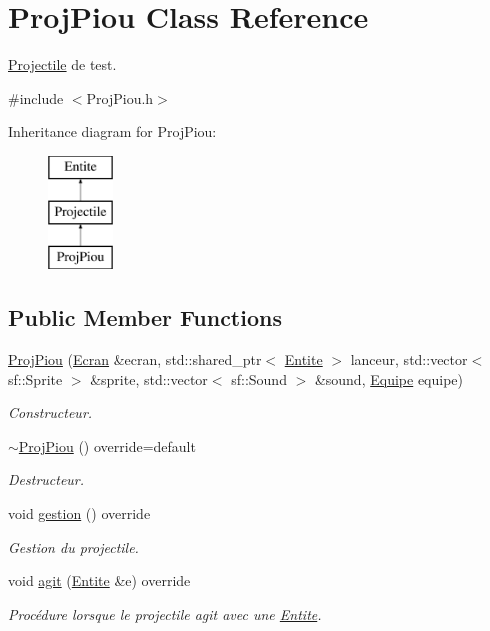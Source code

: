 \hypertarget{class_proj_piou}{}\section{Proj\+Piou Class Reference}
\label{class_proj_piou}


\mbox{\hyperlink{class_projectile}{Projectile}} de test.  




{\ttfamily \#include $<$Proj\+Piou.\+h$>$}

Inheritance diagram for Proj\+Piou\+:\begin{figure}[H]
\begin{center}
\leavevmode
\includegraphics[height=3.000000cm]{class_proj_piou}
\end{center}
\end{figure}
\subsection*{Public Member Functions}
\begin{DoxyCompactItemize}
\item 
\mbox{\hyperlink{class_proj_piou_ad1c36a2d7605a09cd964877850394eac}{Proj\+Piou}} (\mbox{\hyperlink{class_ecran}{Ecran}} \&ecran, std\+::shared\+\_\+ptr$<$ \mbox{\hyperlink{class_entite}{Entite}} $>$ lanceur, std\+::vector$<$ sf\+::\+Sprite $>$ \&sprite, std\+::vector$<$ sf\+::\+Sound $>$ \&sound, \mbox{\hyperlink{constantes_8h_a08fa5554288d5031a8f3bb83cc04ee83}{Equipe}} equipe)
\begin{DoxyCompactList}\small\item\em Constructeur. \end{DoxyCompactList}\item 
\mbox{\hyperlink{class_proj_piou_a47030760366b4c36b2f2d6cbd3db3aa8}{$\sim$\+Proj\+Piou}} () override=default
\begin{DoxyCompactList}\small\item\em Destructeur. \end{DoxyCompactList}\item 
void \mbox{\hyperlink{class_proj_piou_aa25660500d188f1085f8289db91a6170}{gestion}} () override
\begin{DoxyCompactList}\small\item\em Gestion du projectile. \end{DoxyCompactList}\item 
void \mbox{\hyperlink{class_proj_piou_acbc0bea0b23b3daa311679bec7ffe91a}{agit}} (\mbox{\hyperlink{class_entite}{Entite}} \&e) override
\begin{DoxyCompactList}\small\item\em Procédure lorsque le projectile agit avec une \mbox{\hyperlink{class_entite}{Entite}}. \end{DoxyCompactList}\end{DoxyCompactItemize}
